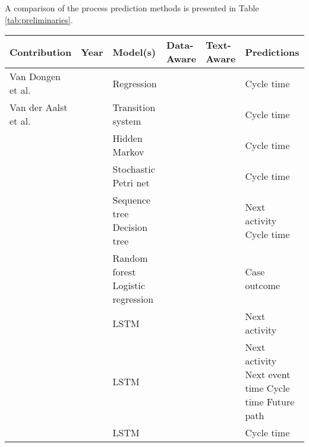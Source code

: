 A comparison of the process prediction methods is presented in Table \ref{tab:preliminaries}.

\begin{table}[]
	\renewcommand{\arraystretch}{1.5}
	\begin{tabularx}{\textwidth}{
			>{\hsize=2.0\hsize}X
			>{\hsize=0.4\hsize}X
			>{\hsize=1.3\hsize}X
			>{\hsize=0.5\hsize}X
			>{\hsize=0.5\hsize}X
			>{\hsize=1.3\hsize}X
		}
		\toprule
		\textbf{Contribution} & \textbf{Year} & \textbf{Model(s)}  & \textbf{Data-Aware} &  \textbf{Text-Aware} & \textbf{Predictions} \\ \midrule
		 Van Dongen et al. \cite{DBLP:conf/otm/DongenCA08}& \citeyear{DBLP:conf/otm/DongenCA08} & Regression  & \checkmark & \xmark& Cycle time\\
		 
		 Van der Aalst et al. \cite{DBLP:journals/is/AalstSS11}&  \citeyear{DBLP:journals/is/AalstSS11}& Transition system  
		   & \xmark & \xmark & Cycle time \\   
		   
		 \citeauthor{DBLP:conf/colcom/PandeyNC11} \cite{DBLP:conf/colcom/PandeyNC11} & \citeyear{DBLP:conf/colcom/PandeyNC11} & Hidden Markov & \xmark & \xmark & Cycle time \\
		 
		 \citeauthor{DBLP:conf/icsoc/Rogge-SoltiW13} \cite{DBLP:conf/icsoc/Rogge-SoltiW13} & \citeyear{DBLP:conf/icsoc/Rogge-SoltiW13} &Stochastic Petri net & \xmark & \xmark & Cycle time\\
		 
		 \citeauthor{DBLP:conf/dis/CeciLFCM14} \cite{DBLP:conf/dis/CeciLFCM14} & \citeyear{DBLP:conf/dis/CeciLFCM14} & Sequence tree \newline Decision tree& \checkmark & \xmark & Next activity \newline Cycle time \\
		 
		 \citeauthor{DBLP:conf/bpm/TeinemaaDMF16}  \cite{DBLP:conf/bpm/TeinemaaDMF16} &  \citeyear{DBLP:conf/bpm/TeinemaaDMF16} & Random forest \newline Logistic regression & \checkmark & \checkmark & Case outcome \\
		 
		 \citeauthor{ DBLP:conf/bpm/EvermannRF16} \cite{ DBLP:conf/bpm/EvermannRF16} &  \citeyear{ DBLP:conf/bpm/EvermannRF16}& LSTM & \xmark & \xmark & Next activity \\
		 
		 \citeauthor{DBLP:conf/caise/TaxVRD17} \cite{DBLP:conf/caise/TaxVRD17} & \citeyear{DBLP:conf/caise/TaxVRD17} & LSTM & \xmark & \xmark & Next activity \newline Next event time \newline Cycle time \newline Future path \\
		 \citeauthor{DBLP:conf/ssci/NavarinVPS17} \cite{DBLP:conf/ssci/NavarinVPS17} &  \citeyear{DBLP:conf/ssci/NavarinVPS17}&  LSTM & \checkmark  & \xmark & Cycle time\\
		 

\end{tabularx}
\end{table}
